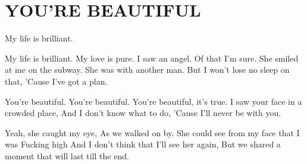 \documentclass[../../../songbook.tex]{subfiles}
\begin{document}
\TabPositions{8cm} %
\section*{YOU'RE BEAUTIFUL}
\vspace{0.5cm}

My life is brilliant. \newline	 

My life is brilliant. My love is pure.	 \newline		
I saw an angel. Of that I'm sure.		 \newline	
She smiled at me on the subway.			 \newline	
She was with another man.				 \newline	
But I won't lose no sleep on that,		 \newline	
'Cause I've got a plan.

\-\hspace{1cm} You're beautiful. You're beautiful.	 \newline	
\-\hspace{1cm} You're beautiful, it's true.			 \newline	
\-\hspace{1cm} I saw your face in a crowded place,	 \newline	
\-\hspace{1cm} And I don't know what to do,			 \newline	
\-\hspace{1cm} 'Cause I'll never be with you.		 \newline	

Yeah, she caught my eye, 							\newline
As we walked on by.									\newline
She could see from my face that I was				\newline
Fucking high 										\newline
And I don't think that I'll see her again,			\newline
But we shared a moment that will last till the end.	\newline
\end{document}
